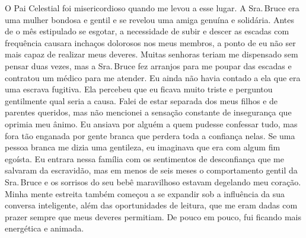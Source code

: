 O Pai Celestial foi misericordioso
quando me levou a esse lugar. A Sra.\,Bruce era uma mulher bondosa e
gentil e se revelou uma amiga genuína e solidária. Antes de o mês
estipulado se esgotar, a necessidade de subir e descer as escadas com
frequência causara inchaços dolorosos nos meus membros, a ponto de eu
não ser mais capaz de realizar meus deveres. Muitas senhoras teriam me
dispensado sem pensar duas vezes, mas a Sra.\,Bruce fez arranjos para me
poupar das escadas e contratou um médico para me atender. Eu ainda não
havia contado a ela que era uma escrava fugitiva. Ela percebeu que eu
ficava muito triste e perguntou gentilmente qual seria a causa. Falei de
estar separada dos meus filhos e de parentes queridos, mas não mencionei
a sensação constante de insegurança que oprimia meu ânimo. Eu ansiava
por alguém a quem pudesse confessar tudo, mas fora tão enganada por
gente branca que perdera toda a confiança nelas. Se uma pessoa branca me
dizia uma gentileza, eu imaginava que era com algum fim egoísta. Eu
entrara nessa família com os sentimentos de desconfiança que me salvaram
da escravidão, mas em menos de seis meses o comportamento gentil da Sra.\,Bruce e os sorrisos do seu bebê maravilhoso estavam degelando meu
coração. Minha mente estreita também começou a se expandir sob a
influência da sua conversa inteligente, além das oportunidades de
leitura, que me eram dadas com prazer sempre que meus deveres permitiam.
De pouco em pouco, fui ficando mais energética e animada.

